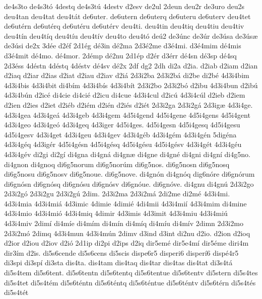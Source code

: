 {de4s3to
de4s3t^^f3
4destq
de4s3t^^fa
4destv
d2esv
de2ul
2deun
deu2r
de3uro
deu2s
deu4tan
deu4tat
deu4t^^e1t
de6uter.
de6utern
de6uterq
de6uteru
de6uterv
deu4tet
de6ut^^e9rn
de6ut^^e9rq
de6ut^^e9ru
de6ut^^e9rv
deu4ti.
deu4tin
deu4tiq
deu4tiu
deu4tiv
deu4t^^edn
deu4t^^edq
deu4t^^edu
deu4t^^edv
deu4to
deu4t^^f3
de^^fa2
de3^^fanc
de3^^far
de3^^fasa
de3^^fas^^e6
de3^^fasi
de2x
3d^^e9e
d2^^e9f
2d1^^e9g
d^^e93in
d^^e92ma
2d3^^e92me
d3^^e94mi.
d3^^e94mim
d^^e94mis
d3^^e94mit
d^^e94mo.
d^^e94mor.
2d^^e9mp
d^^e92nu
2d1^^e9p
d2^^e9r
d3^^e9rr
d^^e94sn
d^^e93sp
d^^e94sq
2d3^^e9ss
4d^^e9stn
4d^^e9stq
4d^^e9stv
d^^e94sv
d^^e92x
2df
dg2
2dh
di2a
d2ia.
d2iab
d2iam
d2ian
d2iaq
d2iar
d2ias
d2iat
d2iau
d2iav
d2i^^e1
2d3i2ba
2d3i2b^^e1
di2be
di2b^^e9
4d3i4bim
4d3i4bis
4d3i4bit
di4b^^edm
4d3i4b^^eds
4d3i4b^^edt
2d3i2bo
2d3i2b^^f3
d2ibu
4d3i4bun
d2ib^^fa
4d3i4b^^fan
d2ic^^e9
di4cie
di4ci^^e9
d2icu
di4cue
4d3i4cul
d2ic^^fa
4d3i4c^^fal
d2ieb
d2iem
d2ien
d2ies
d2iet
d2i^^e9b
d2i^^e9m
d2i^^e9n
d2i^^e9s
d2i^^e9t
2d3i2ga
2d3i2g^^e1
2d3ig^^e6
4d3i4ge.
4d3i4gea
4d3i4ge^^e1
4d3i4geb
4d3i4gem
4d5i4gend
4d5i4gene
4d5i4gens
4d5i4gent
4d3i4geo
4d3i4ge^^f3
4d3i4geq
4d3iger
4d5i4ges.
4d5i4gesn
4d5i4gesq
4d5i4gesu
4d5i4gesv
4d3i4get
4d3i4geu
4d3i4gev
4d3i4g^^e9b
4d3i4g^^e9m
4d3i4g^^e9n
5dig^^e9na
4d3i4g^^e9q
4d3ig^^e9r
4d5i4g^^e9sn
4d5i4g^^e9sq
4d5i4g^^e9su
4d5i4g^^e9sv
4d3i4g^^e9t
4d3i4g^^e9u
4d3i4g^^e9v
di2gi
di2g^^ed
di4gna
di4gn^^e1
di4gn^^e6
di4gne
di4gn^^e9
di4gni
di4gn^^ed
di4g5no.
di4gnon
di4gnoq
di6g5norum
di6g5nor^^fam
di6g5nos.
di6g5nosn
di6g5nosq
di6g5nosu
di6g5nosv
di6g5noue.
di6g5nove.
di4gn^^f3n
di4gn^^f3q
dig6n^^f3re
di6gn^^f3rum
di6gn^^f3sn
di6gn^^f3sq
di6gn^^f3su
di6gn^^f3sv
di6gn^^f3ue.
di6gn^^f3ve.
di4gnu
di4gn^^fa
2d3i2go
2d3i2g^^f3
2d3i2gu
2d3i2g^^fa
2dim.
2d3i2ma
2d3i2m^^e1
2di2me
di2m^^e9
4d3i4mi.
4d3i4mia
4d3i4mi^^e1
4d3imic
4dimie
4dimi^^e9
4di4mii
4d3i4mi^^ed
4d3i4mim
di4mine
4d3i4mio
4d3i4mi^^f3
4d3i4miq
4dimir
4d3imis
4d3imit
4d3i4miu
4d3i4mi^^fa
4d3i4miv
2dim^^ed
di4m^^ede
di4m^^edm
di4m^^edn
di4m^^edq
di4m^^edu
di4m^^edv
2dimn
2d3i2mo
2d3i2m^^f3
2dimq
4d3i4mun
4d3i4m^^fan
2dimv
d3ind
d3int
di2nu
d2io.
d2ion
d2ioq
d2ior
d2iou
d2iov
d2i^^f3
2d1ip
di2pi
d2ips
d2iq
dir5em^^e9
dir5e4m^^ed
dir5^^e9me
diri4m
dir3^^edm
d2is.
di5s6cende
di5s6cens
di5scis
dispe6r5
disperi6
disper^^ed6
disp^^e94r5
di3spi
di3sp^^ed
di3sta
dis4ta.
dis4tam
dis4taq
dis4tar
dis4tas
dis4tat
di3s4t^^e1
di5s4tem
di5s6tent.
di5s6tentn
di5s6tentq
di5s6tentue
di5s6tentv
di5stern
di5s4tes
di5s4tet
di5s4t^^e9m
di5s6t^^e9ntn
di5s6t^^e9ntq
di5s6t^^e9ntue
di5s6t^^e9ntv
di5s6t^^e9rn
di5s4t^^e9s
di5s4t^^e9t
}
